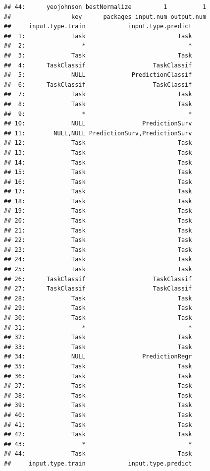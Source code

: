 \documentclass[]{article}
\begin{document}
\begin{verbatim}
## 44:      yeojohnson bestNormalize         1          1
##                 key      packages input.num output.num
##     input.type.train            input.type.predict
##  1:             Task                          Task
##  2:                *                             *
##  3:             Task                          Task
##  4:      TaskClassif                   TaskClassif
##  5:             NULL             PredictionClassif
##  6:      TaskClassif                   TaskClassif
##  7:             Task                          Task
##  8:             Task                          Task
##  9:                *                             *
## 10:             NULL                PredictionSurv
## 11:        NULL,NULL PredictionSurv,PredictionSurv
## 12:             Task                          Task
## 13:             Task                          Task
## 14:             Task                          Task
## 15:             Task                          Task
## 16:             Task                          Task
## 17:             Task                          Task
## 18:             Task                          Task
## 19:             Task                          Task
## 20:             Task                          Task
## 21:             Task                          Task
## 22:             Task                          Task
## 23:             Task                          Task
## 24:             Task                          Task
## 25:             Task                          Task
## 26:      TaskClassif                   TaskClassif
## 27:      TaskClassif                   TaskClassif
## 28:             Task                          Task
## 29:             Task                          Task
## 30:             Task                          Task
## 31:                *                             *
## 32:             Task                          Task
## 33:             Task                          Task
## 34:             NULL                PredictionRegr
## 35:             Task                          Task
## 36:             Task                          Task
## 37:             Task                          Task
## 38:             Task                          Task
## 39:             Task                          Task
## 40:             Task                          Task
## 41:             Task                          Task
## 42:             Task                          Task
## 43:                *                             *
## 44:             Task                          Task
##     input.type.train            input.type.predict

\end{verbatim}
\end{document}
